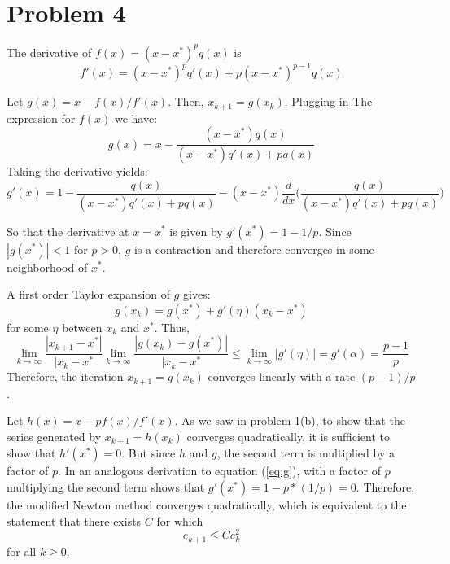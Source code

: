 \documentclass{homework}
\begin{document}
\section{Problem 4}
\begin{letterenum}
\item The derivative of $f(x) = (x - x^*)^p q(x)$ is
\begin{equation}
    f'(x) = (x - x^*)^p q'(x) + p (x - x^*)^{p-1} q(x)
\end{equation}

Let $g(x) = x - f(x) / f'(x)$. Then,  $x_{k+1} = g(x_k)$. Plugging in The
expression for $f(x)$ we have:
\begin{equation*}
    g(x) = x - \frac{(x - x^*) q(x) }{(x - x^*) q'(x) + p q(x)}
\end{equation*}
Taking the derivative yields:
\begin{equation}
    g'(x) = 1 - \frac{q(x)}{(x- x^*) q'(x) + p q(x)} - (x - x^*)\frac{d}{dx} \biggl(
        \frac{q(x)}{(x - x^*) q'(x) + p q(x)}
    \biggr)
    \label{eq:g}
\end{equation}

So that the derivative at $x = x^*$ is given by $g'(x^*) = 1 - 1/p$. Since $|g(x^*)| < 1$
for $p>0$, $g$ is a contraction and therefore converges in some neighborhood of $x^*$.

A first order Taylor expansion of $g$ gives:
\begin{equation}
    g(x_k) = g(x^*) + g'(\eta) (x_k - x^*)
\end{equation}
for some $\eta$ between $x_k$ and $x^*$. Thus,
\begin{equation*}
    \lim_{k\to\infty} \frac{|x_{k+1} - x^*|}{|x_k - x^*} 
        \lim_{k\to\infty} \frac{|g(x_k) - g(x^*)|}{|x_k - x^*} 
        \leq \lim_{k\to\infty} |g'(\eta)| = g'(\alpha) = \frac{p-1}{p}
\end{equation*}
Therefore, the iteration $x_{k+1} = g(x_k)$ converges linearly with a rate $(p-1)/p$.

\item Let $h(x) = x - p f(x) / f'(x)$. As we saw in problem 1(b), to show that
the series generated by $x_{k+1} = h(x_k)$ converges quadratically, it is sufficient
to show that $h'(x^*) = 0$. But since $h$ and $g$, the second term is multiplied
by a factor of $p$. In an analogous derivation to equation (\ref{eq:g}), with
a factor of $p$ multiplying the second term shows that $g'(x^*) = 1 - p * (1 / p) = 0$.
Therefore, the modified Newton method converges quadratically, which is equivalent
to the statement that there exists $C$ for which
\begin{equation*}
    e_{k+1} \leq C e_k^2
\end{equation*}
for all $k\geq 0$.


\end{letterenum}
\end{document}
